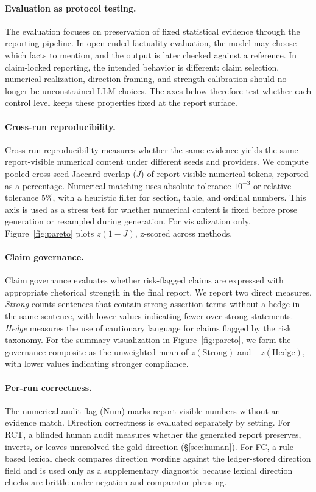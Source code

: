 \documentclass[10pt,twocolumn]{article}
\begin{document}
\paragraph{Evaluation as protocol testing.}
The evaluation focuses on preservation of fixed statistical evidence through the reporting pipeline. In open-ended factuality evaluation, the model may choose which facts to mention, and the output is later checked against a reference. In claim-locked reporting, the intended behavior is different: claim selection, numerical realization, direction framing, and strength calibration should no longer be unconstrained LLM choices. The axes below therefore test whether each control level keeps these properties fixed at the report surface.

\paragraph{Cross-run reproducibility.}
Cross-run reproducibility measures whether the same evidence yields the same report-visible numerical content under different seeds and providers. We compute pooled cross-seed Jaccard overlap ($J$) of report-visible numerical tokens, reported as a percentage. Numerical matching uses absolute tolerance $10^{-3}$ or relative tolerance $5\%$, with a heuristic filter for section, table, and ordinal numbers. This axis is used as a stress test for whether numerical content is fixed before prose generation or resampled during generation. For visualization only, Figure~\ref{fig:pareto} plots $z(1-J)$, z-scored across methods.


\paragraph{Claim governance.} 
Claim governance evaluates whether risk-flagged claims are expressed with appropriate rhetorical strength in the final report. We report two direct measures. \textit{Strong} counts sentences that contain strong assertion terms without a hedge in the same sentence, with lower values indicating fewer over-strong statements. \textit{Hedge} measures the use of cautionary language for claims flagged by the risk taxonomy. For the summary visualization in Figure~\ref{fig:pareto}, we form the governance composite as the unweighted mean of $z(\mathrm{Strong})$ and $-z(\mathrm{Hedge})$, with lower values indicating stronger compliance.

\paragraph{Per-run correctness.}
The numerical audit flag (Num) marks report-visible numbers without an evidence match. Direction correctness is evaluated separately by setting. For RCT, a blinded human audit measures whether the generated report preserves, inverts, or leaves unresolved the gold direction (\S\ref{sec:human}). For FC, a rule-based lexical check compares direction wording against the ledger-stored direction field and is used only as a supplementary diagnostic because lexical direction checks are brittle under negation and comparator phrasing.
\end{document}
